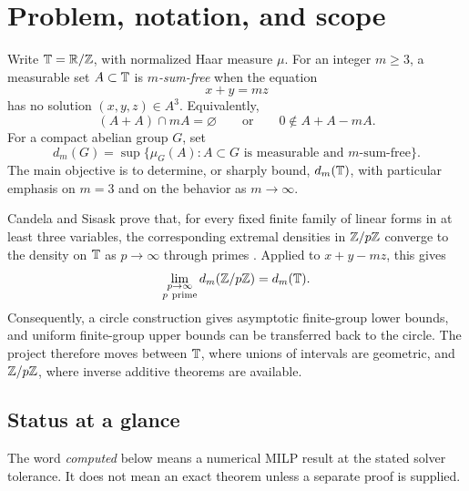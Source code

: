 \section{Problem, notation, and scope}
\label{sec:problem-and-scope}

Write \(\mathbb T=\mathbb R/\mathbb Z\), with normalized Haar measure \(\mu\).  For an
integer \(m\geq 3\), a measurable set \(A\subset\mathbb T\) is \emph{\(m\)-sum-free}
when the equation
\[
    x+y=mz
\]
has no solution \((x,y,z)\in A^3\).  Equivalently,
\[
    (A+A)\cap mA=\varnothing
    \qquad\text{or}\qquad
    0\notin A+A-mA.
\]
For a compact abelian group \(G\), set
\[
    d_m(G)=\sup\{\mu_G(A):A\subset G\text{ is measurable and }m\text{-sum-free}\}.
\]
The main objective is to determine, or sharply bound, \(d_m(\mathbb T)\), with
particular emphasis on \(m=3\) and on the behavior as \(m\to\infty\).

Candela and Sisask prove that, for every fixed finite family of linear forms in
at least three variables, the corresponding extremal densities in \(\mathbb Z/p\mathbb Z\)
converge to the density on \(\mathbb T\) as \(p\to\infty\) through primes
\cite[Theorem~1.3]{CandelaSisask2011}.  Applied to \(x+y-mz\), this gives
\[
    \lim_{\substack{p\to\infty\\p\ \mathrm{prime}}}d_m(\Zp)=d_m(\T).
\]
Consequently, a circle construction gives asymptotic finite-group lower
bounds, and uniform finite-group upper bounds can be transferred back to the
circle.  The project therefore moves between \(\mathbb T\), where unions of intervals
are geometric, and \(\mathbb Z/p\mathbb Z\), where inverse additive theorems are available.

\subsection{Status at a glance}

The word \emph{computed} below means a numerical MILP result at the stated
solver tolerance.  It does not mean an exact theorem unless a separate proof
is supplied.

